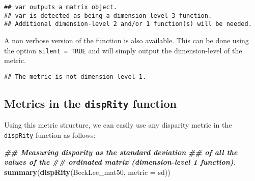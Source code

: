 \documentclass[
]{book}
\newenvironment{Shaded}{\begin{snugshade}}{\end{snugshade}}
\newcommand{\AttributeTok}[1]{\textcolor[rgb]{0.13,0.29,0.53}{#1}}
\newcommand{\ConstantTok}[1]{\textcolor[rgb]{0.56,0.35,0.01}{#1}}
\newcommand{\ControlFlowTok}[1]{\textcolor[rgb]{0.13,0.29,0.53}{\textbf{#1}}}
\newcommand{\DocumentationTok}[1]{\textcolor[rgb]{0.56,0.35,0.01}{\textbf{\textit{#1}}}}
\newcommand{\FunctionTok}[1]{\textcolor[rgb]{0.13,0.29,0.53}{\textbf{#1}}}
\newcommand{\NormalTok}[1]{#1}
\newcommand{\SpecialCharTok}[1]{\textcolor[rgb]{0.81,0.36,0.00}{\textbf{#1}}}
\newcommand{\StringTok}[1]{\textcolor[rgb]{0.31,0.60,0.02}{#1}}
\begin{document}
\begin{verbatim}
## var outputs a matrix object.
## var is detected as being a dimension-level 3 function.
## Additional dimension-level 2 and/or 1 function(s) will be needed.
\end{verbatim}

A non verbose version of the function is also available.
This can be done using the option \texttt{silent\ =\ TRUE} and will simply output the dimension-level of the metric.

\begin{Shaded}
\end{Shaded}

\begin{verbatim}
## The metric is not dimension-level 1.
\end{verbatim}

\hypertarget{metrics-in-the-disprity-function}{%
\subsection{\texorpdfstring{Metrics in the \texttt{dispRity} function}{Metrics in the dispRity function}}\label{metrics-in-the-disprity-function}}

Using this metric structure, we can easily use any disparity metric in the \texttt{dispRity} function as follows:

\begin{Shaded}
\begin{Highlighting}[]
\DocumentationTok{\#\# Measuring disparity as the standard deviation}
\DocumentationTok{\#\# of all the values of the}
\DocumentationTok{\#\# ordinated matrix (dimension{-}level 1 function).}
\FunctionTok{summary}\NormalTok{(}\FunctionTok{dispRity}\NormalTok{(BeckLee\_mat50, }\AttributeTok{metric =}\NormalTok{ sd))}
\end{Highlighting}
\end{Shaded}
\end{document}
